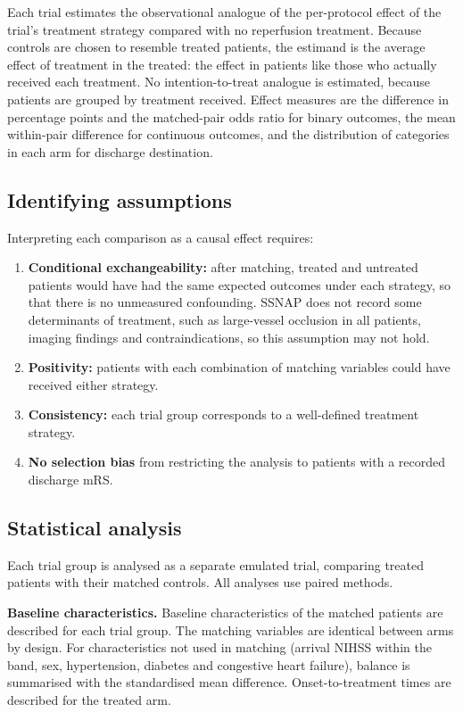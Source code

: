 Each trial estimates the observational analogue of the per-protocol effect of the trial's treatment strategy compared with no reperfusion treatment. Because controls are chosen to resemble treated patients, the estimand is the average effect of treatment in the treated: the effect in patients like those who actually received each treatment. No intention-to-treat analogue is estimated, because patients are grouped by treatment received. Effect measures are the difference in percentage points and the matched-pair odds ratio for binary outcomes, the mean within-pair difference for continuous outcomes, and the distribution of categories in each arm for discharge destination.

\subsection{Identifying assumptions}

Interpreting each comparison as a causal effect requires:
\begin{enumerate}
\item \textbf{Conditional exchangeability:} after matching, treated and untreated patients would have had the same expected outcomes under each strategy, so that there is no unmeasured confounding. SSNAP does not record some determinants of treatment, such as large-vessel occlusion in all patients, imaging findings and contraindications, so this assumption may not hold.
\item \textbf{Positivity:} patients with each combination of matching variables could have received either strategy.
\item \textbf{Consistency:} each trial group corresponds to a well-defined treatment strategy.
\item \textbf{No selection bias} from restricting the analysis to patients with a recorded discharge mRS.
\end{enumerate}

\subsection{Statistical analysis}

Each trial group is analysed as a separate emulated trial, comparing treated patients with their matched controls. All analyses use paired methods.

\textbf{Baseline characteristics.} Baseline characteristics of the matched patients are described for each trial group. The matching variables are identical between arms by design. For characteristics not used in matching (arrival NIHSS within the band, sex, hypertension, diabetes and congestive heart failure), balance is summarised with the standardised mean difference. Onset-to-treatment times are described for the treated arm.

